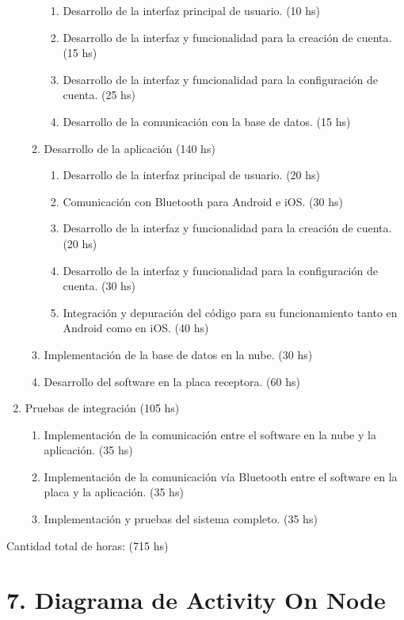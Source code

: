 \documentclass[11pt]{charter}
\begin{document}
\begin{enumerate}
\begin{enumerate}
		\begin{enumerate}
		\item Desarrollo de la interfaz principal de usuario. (10 hs)
		\item Desarrollo de la interfaz y funcionalidad para la creación de cuenta. (15 hs)
		\item Desarrollo de la interfaz y funcionalidad para la configuración de cuenta. (25 hs)
		\item Desarrollo de la comunicación con la base de datos. (15 hs)
		\end{enumerate}
	\item Desarrollo de la aplicación (140 hs)
		\begin{enumerate}
		\item Desarrollo de la interfaz principal de usuario. (20 hs)
		\item Comunicación con Bluetooth para Android e iOS. (30 hs)
		\item Desarrollo de la interfaz y funcionalidad para la creación de cuenta. (20 hs)
		\item Desarrollo de la interfaz y funcionalidad para la configuración de cuenta. (30 hs)
		\item Integración y depuración del código para su funcionamiento tanto en Android como en iOS. (40 hs)
		\end{enumerate}
	\item Implementación de la base de datos en la nube. (30 hs)
	\item Desarrollo del software en la placa receptora. (60 hs)
	\end{enumerate}
\item Pruebas de integración (105 hs)
	\begin{enumerate}
	\item Implementación de la comunicación entre el software en la nube y la aplicación. (35 hs)
	\item Implementación de la comunicación vía Bluetooth entre el software en la placa y la aplicación. (35 hs)
	\item Implementación y pruebas del sistema completo. (35 hs)
	\end{enumerate}
	
\end{enumerate}

Cantidad total de horas: (715 hs)


\section{7. Diagrama de Activity On Node}
\label{sec:AoN}
\end{document}
